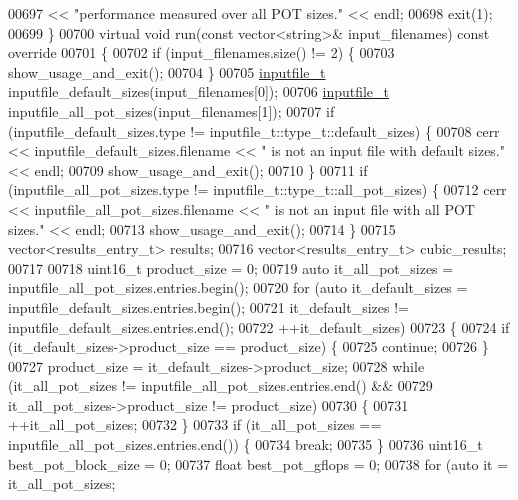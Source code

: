\begin{DoxyCode}
{{{{{{00697          << \textcolor{stringliteral}{"performance measured over all POT sizes."} << endl;
00698     exit(1);
00699   \}
00700   \textcolor{keyword}{virtual} \textcolor{keywordtype}{void} run(\textcolor{keyword}{const} vector<string>& input\_filenames)\textcolor{keyword}{ const override}
00701 \textcolor{keyword}{  }\{
00702     \textcolor{keywordflow}{if} (input\_filenames.size() != 2) \{
00703       show\_usage\_and\_exit();
00704     \}
00705     \hyperlink{structinputfile__t}{inputfile\_t} inputfile\_default\_sizes(input\_filenames[0]);
00706     \hyperlink{structinputfile__t}{inputfile\_t} inputfile\_all\_pot\_sizes(input\_filenames[1]);
00707     \textcolor{keywordflow}{if} (inputfile\_default\_sizes.type != inputfile\_t::type\_t::default\_sizes) \{
00708       cerr << inputfile\_default\_sizes.filename << \textcolor{stringliteral}{" is not an input file with default sizes."} << endl;
00709       show\_usage\_and\_exit();
00710     \}
00711     \textcolor{keywordflow}{if} (inputfile\_all\_pot\_sizes.type != inputfile\_t::type\_t::all\_pot\_sizes) \{
00712       cerr << inputfile\_all\_pot\_sizes.filename << \textcolor{stringliteral}{" is not an input file with all POT sizes."} << endl;
00713       show\_usage\_and\_exit();
00714     \}
00715     vector<results\_entry\_t> results;
00716     vector<results\_entry\_t> cubic\_results;
00717     
00718     uint16\_t product\_size = 0;
00719     \textcolor{keyword}{auto} it\_all\_pot\_sizes = inputfile\_all\_pot\_sizes.entries.begin();
00720     \textcolor{keywordflow}{for} (\textcolor{keyword}{auto} it\_default\_sizes = inputfile\_default\_sizes.entries.begin();
00721          it\_default\_sizes != inputfile\_default\_sizes.entries.end();
00722          ++it\_default\_sizes)
00723     \{
00724       \textcolor{keywordflow}{if} (it\_default\_sizes->product\_size == product\_size) \{
00725         \textcolor{keywordflow}{continue};
00726       \}
00727       product\_size = it\_default\_sizes->product\_size;
00728       \textcolor{keywordflow}{while} (it\_all\_pot\_sizes != inputfile\_all\_pot\_sizes.entries.end() &&
00729              it\_all\_pot\_sizes->product\_size != product\_size)
00730       \{
00731         ++it\_all\_pot\_sizes;
00732       \}
00733       \textcolor{keywordflow}{if} (it\_all\_pot\_sizes == inputfile\_all\_pot\_sizes.entries.end()) \{
00734         \textcolor{keywordflow}{break};
00735       \}
00736       uint16\_t best\_pot\_block\_size = 0;
00737       \textcolor{keywordtype}{float} best\_pot\_gflops = 0;
00738       \textcolor{keywordflow}{for} (\textcolor{keyword}{auto} it = it\_all\_pot\_sizes;
}}}}}}
\end{DoxyCode}
